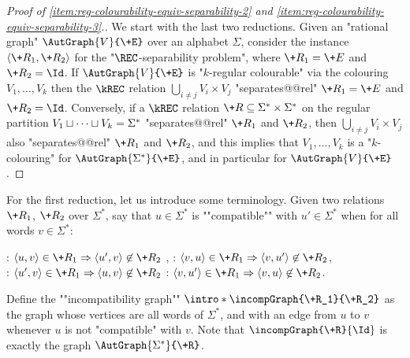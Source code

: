 \begin{proof}[Proof of \eqref{item:reg-colourability-equiv-separability-2} and
    \eqref{item:reg-colourability-equiv-separability-3}.]
    We start with the last two reductions.
    Given an "rational graph" $\AutGraph{V}{\+E}$ over an alphabet $\Sigma$, consider the instance
    $\tup{\+R_1, \+R_2}$ for the "$\REC$-separability problem", where 
    $\+R_1 = \+E$ and $\+R_2 = \Id$. 
    If $\AutGraph{V}{\+E}$ is "$k$-regular colourable" via the colouring $V_1, \dotsc, V_k$ then the $\kREC$ relation
    $\bigcup_{i \neq j} V_i \times V_j$ "separates@@rel" $\+R_1 = \+E$ and $\+R_2 = \Id$. 
    Conversely, if a $\kREC$ relation $\+R \subseteq \Sigma^* \times \Sigma^*$ on the regular 
    partition $V_1 \sqcup \dotsb \sqcup V_k = \Sigma^*$ "separates@@rel" $\+R_1$ and $\+R_2$, then $\bigcup_{i \neq j} V_i \times V_j$ also "separates@@rel" $\+R_1$ and $\+R_2$, and this implies that $V_1, \dotsc, V_k$ is a "$k$-colouring" for $\AutGraph{\Sigma^*}{\+E}$, and in particular
    for $\AutGraph{V}{\+E}$.
\end{proof}

\AP For the first reduction, let us introduce some terminology.
Given two relations $\+R_1$, $\+R_2$ over $\Sigma^*$, say that
$u \in \Sigma^*$ is ""compatible"" with
$u' \in \Sigma^*$ when for all words $v \in \Sigma^*$:
\begin{center}
    \intro*\compL: $\tup{u,v} \in \+R_1 \Rightarrow \tup{u',v} \not\in \+R_2$%
    ,\hphantom{\text{ \fancyand }}
    \intro*\compR: $\tup{v,u} \in \+R_1 \Rightarrow \tup{v,u'} \not\in \+R_2$,\\
    \intro*\compLpr: $\tup{u',v} \in \+R_1 \Rightarrow \tup{u,v} \not\in \+R_2$%
    \hphantom{,}\text{ \fancyand }
    \intro*\compRpr: $\tup{v,u'} \in \+R_1 \Rightarrow \tup{v,u} \not\in \+R_2$.
\end{center}
\AP
Define the ""incompatibility graph"" $\intro*\incompGraph{\+R_1}{\+R_2}$
as the graph whose vertices are all words of $\Sigma^*$,
and with an edge from $u$ to $v$ whenever $u$ is not "compatible" with $v$.
Note that $\incompGraph{\+R}{\Id}$ is exactly the graph $\AutGraph{\Sigma^*}{\+R}$.

